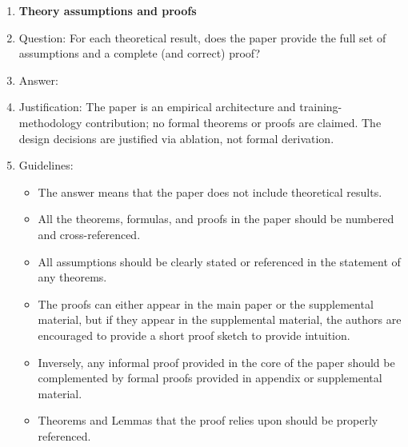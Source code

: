 \begin{enumerate}
\item {\bf Theory assumptions and proofs}
    \item[] Question: For each theoretical result, does the paper provide the full set of assumptions and a complete (and correct) proof?
    \item[] Answer: \answerNA{}
    \item[] Justification: The paper is an empirical architecture and training-methodology contribution; no formal theorems or proofs are claimed. The design decisions are justified via ablation, not formal derivation.
    \item[] Guidelines:
    \begin{itemize}
        \item The answer \answerNA{} means that the paper does not include theoretical results.
        \item All the theorems, formulas, and proofs in the paper should be numbered and cross-referenced.
        \item All assumptions should be clearly stated or referenced in the statement of any theorems.
        \item The proofs can either appear in the main paper or the supplemental material, but if they appear in the supplemental material, the authors are encouraged to provide a short proof sketch to provide intuition.
        \item Inversely, any informal proof provided in the core of the paper should be complemented by formal proofs provided in appendix or supplemental material.
        \item Theorems and Lemmas that the proof relies upon should be properly referenced.
    \end{itemize}


\end{enumerate}
